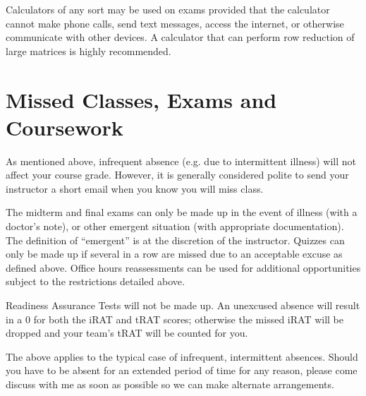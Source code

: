 \documentclass{article}
\begin{document}
Calculators of any sort may be used on exams provided that the calculator cannot make phone calls, send text messages, access the internet, or otherwise communicate with other devices.  A calculator that can perform row reduction of large matrices is highly recommended.

\section*{\fontsize{12}{15}\selectfont Missed Classes, Exams and Coursework}

As mentioned above, infrequent absence (e.g. due to intermittent illness) will not affect your course grade.  However, it is generally considered polite to send your instructor a short email when you know you will miss class.  

The midterm and final exams can only be made up in the event of illness (with a doctor's note), or other emergent situation (with appropriate documentation).  The definition of ``emergent'' is at the discretion of the instructor. Quizzes can only be made up if several in a row are missed due to an acceptable excuse as defined above.  Office hours reassessments can be used for additional opportunities subject to the restrictions detailed above.

Readiness Assurance Tests will not be made up. An unexcused absence will result in a 0 for both the iRAT and tRAT scores; otherwise the missed iRAT will be dropped and your team's tRAT will be counted for you.   

The above applies to the typical case of infrequent, intermittent absences. Should you have to be absent for an extended period of time for any reason, please come discuss with me as soon as possible so we can make alternate arrangements.
\end{document}
